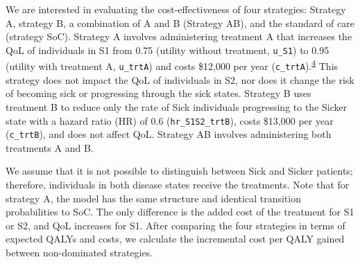 \documentclass[
]{article}
\begin{document}
We are interested in evaluating the cost-effectiveness of four strategies: Strategy A, strategy B, a combination of A and B (Strategy AB), and the standard of care (strategy SoC). Strategy A involves administering treatment A that increases the QoL of individuals in S1 from 0.75 (utility without treatment, \texttt{u\_S1}) to 0.95 (utility with treatment A, \texttt{u\_trtA}) and costs \$12,000 per year (\texttt{c\_trtA}).\textsuperscript{\protect\hyperlink{ref-Krijkamp2018}{4}} This strategy does not impact the QoL of individuals in S2, nor does it change the risk of becoming sick or progressing through the sick states. Strategy B uses treatment B to reduce only the rate of Sick individuals progressing to the Sicker state with a hazard ratio (HR) of 0.6 (\texttt{hr\_S1S2\_trtB}), costs \$13,000 per year (\texttt{c\_trtB}), and does not affect QoL. Strategy AB involves administering both treatments A and B.

We assume that it is not possible to distinguish between Sick and Sicker patients; therefore, individuals in both disease states receive the treatments. Note that for strategy A, the model has the same structure and identical transition probabilities to SoC. The only difference is the added cost of the treatment for S1 or S2, and QoL increases for S1. After comparing the four strategies in terms of expected QALYs and costs, we calculate the incremental cost per QALY gained between non-dominated strategies.
\end{document}
